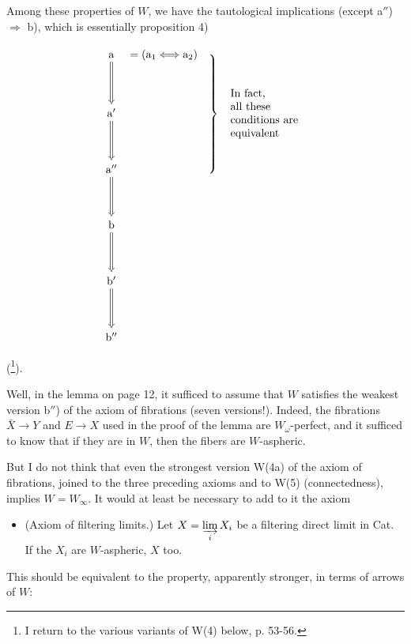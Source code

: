 \documentclass[11pt]{article}
\newcommand{\printedpage}[1]{\marginpar{\footnotesize p.~#1}}
\begin{document}
Among these properties of $W$, we have the tautological implications (except a$''$) $\Longrightarrow$ b), which is essentially proposition 4)

\printedpage{12}

\[
\begin{tikzcd}[row sep=huge, column sep=0pt]
\mathrm{a} \arrow[d, Rightarrow] & {}= (\mathrm{a}_1 \Longleftrightarrow \mathrm{a}_2) & \hspace{2.5cm} \\
\mathrm{a}' \arrow[d, Rightarrow] & & \smash{\left.\rule[-1.8cm]{0pt}{3.6cm}\right\}\ \text{\begin{tabular}{l}In fact,\\ all these\\ conditions are\\ equivalent\end{tabular}}} \\
\mathrm{a}'' \arrow[d, Rightarrow] & & \\
\mathrm{b} \arrow[d, Rightarrow] & & \\
\mathrm{b}' \arrow[d, Rightarrow] & & \\
\mathrm{b}'' & &
\end{tikzcd}
\]

(\footnote[33]{I return to the various variants of W(4) below, p. 53-56.}).

Well, in the lemma on page 12, it sufficed to assume that $W$ satisfies the weakest version b$''$) of the axiom of fibrations (seven versions!). Indeed, the fibrations $\bar{X} \longrightarrow Y$ and $E \longrightarrow X$ used in the proof of the lemma are $W_\omega$-perfect, and it sufficed to know that if they are in $W$, then the fibers are $W$-aspheric.

But I do not think that even the strongest version W(4a) of the axiom of fibrations, joined to the three preceding axioms and to W(5) (connectedness), implies $W = W_\infty$. It would at least be necessary to add to it the axiom

\begin{itemize}[leftmargin=4em, labelwidth=3em, labelsep=0.6em]
\item[\textbf{W(6)}] (Axiom of filtering limits.) Let $X = \varinjlim\limits_{i} X_i$ be a filtering direct limit in Cat. If the $X_i$ are $W$-aspheric, $X$ too.
\end{itemize}

This should be equivalent to the property, apparently stronger, in terms of arrows of $W$:
\end{document}
